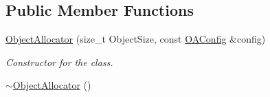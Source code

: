 \subsection*{Public Member Functions}
\begin{DoxyCompactItemize}
\item 
\hyperlink{classObjectAllocator_a8f579b514d1fe072f6dc54491868289a}{Object\-Allocator} (size\-\_\-t Object\-Size, const \hyperlink{structOAConfig}{O\-A\-Config} \&config)
\begin{DoxyCompactList}\small\item\em Constructor for the class. \end{DoxyCompactList}\item 
\hypertarget{classObjectAllocator_a54f72cc0c3da36db8d59ca4ab54e6ecc}{\hyperlink{classObjectAllocator_a54f72cc0c3da36db8d59ca4ab54e6ecc}{$\sim$\-Object\-Allocator} ()}\label{classObjectAllocator_a54f72cc0c3da36db8d59ca4ab54e6ecc}


\end{DoxyCompactItemize}

